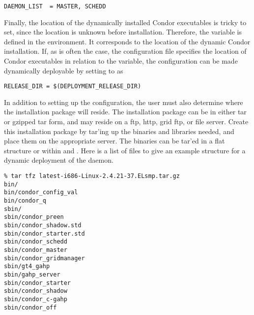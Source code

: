 \footnotesize
\begin{verbatim}
DAEMON_LIST  = MASTER, SCHEDD
\end{verbatim}
\normalsize

Finally, the location
of the dynamically installed Condor executables is tricky to set,
since the location is unknown before installation.
Therefore,
the variable  is defined in the environment.
It corresponds to the location of the dynamic Condor installation.
If, as is often the case, 
the configuration file specifies the location of Condor executables in
relation to the  variable, the configuration can
be made dynamically deployable by setting  to
 as 

\footnotesize
\begin{verbatim}
RELEASE_DIR = $(DEPLOYMENT_RELEASE_DIR)
\end{verbatim}
\normalsize

In addition to setting up the configuration, the user must also
determine where the installation package will reside.
The installation package can be in either tar or 
gzipped tar form, and may
reside on a ftp, http, grid ftp, or file server.  
Create this installation package by tar'ing up the binaries and libraries
needed, and place them on the appropriate server.
The binaries can be tar'ed in a flat structure or within  and
.  Here is a list of files to give an example
structure for a dynamic deployment of the  daemon.

\footnotesize
\begin{verbatim}
% tar tfz latest-i686-Linux-2.4.21-37.ELsmp.tar.gz
bin/
bin/condor_config_val
bin/condor_q
sbin/
sbin/condor_preen
sbin/condor_shadow.std
sbin/condor_starter.std
sbin/condor_schedd
sbin/condor_master
sbin/condor_gridmanager
sbin/gt4_gahp
sbin/gahp_server
sbin/condor_starter
sbin/condor_shadow
sbin/condor_c-gahp
sbin/condor_off 
\end{verbatim}
\normalsize
